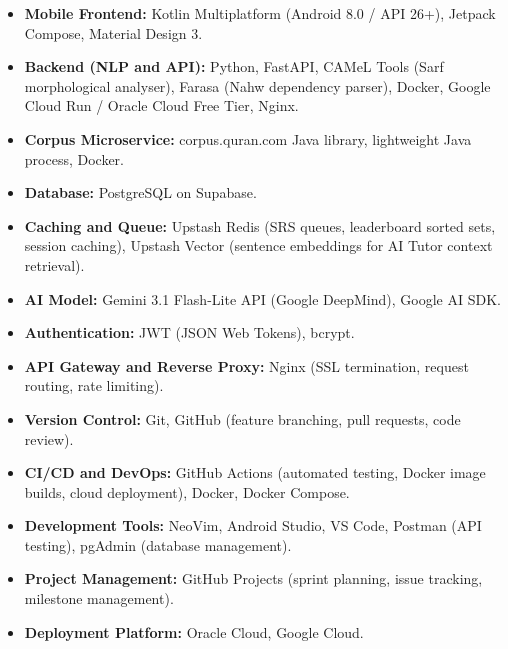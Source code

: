 \documentclass[A4paper,12pt]{article}
\begin{document}
\begin{itemize}[leftmargin=1.5em]

    \item \textbf{Mobile Frontend:}
    Kotlin Multiplatform (Android 8.0 / API 26+), Jetpack Compose, Material Design 3.

    \item \textbf{Backend (NLP and API):}
    Python, FastAPI, CAMeL Tools (Sarf morphological analyser), Farasa (Nahw dependency parser),
    Docker, Google Cloud Run / Oracle Cloud Free Tier, Nginx.

    \item \textbf{Corpus Microservice:}
    corpus.quran.com Java library, lightweight Java process, Docker.

    \item \textbf{Database:}
    PostgreSQL on Supabase.

    \item \textbf{Caching and Queue:}
    Upstash Redis (SRS queues, leaderboard sorted sets, session caching),
    Upstash Vector (sentence embeddings for AI Tutor context retrieval).

    \item \textbf{AI Model:}
    Gemini 3.1 Flash-Lite API (Google DeepMind), Google AI SDK.

    \item \textbf{Authentication:}
    JWT (JSON Web Tokens), bcrypt.

    \item \textbf{API Gateway and Reverse Proxy:}
    Nginx (SSL termination, request routing, rate limiting).

    \item \textbf{Version Control:}
    Git, GitHub (feature branching, pull requests, code review).

    \item \textbf{CI/CD and DevOps:}
    GitHub Actions (automated testing, Docker image builds, cloud deployment), Docker, Docker Compose.

    \item \textbf{Development Tools:}
    NeoVim, Android Studio, VS Code, Postman (API testing), pgAdmin (database management).

    \item \textbf{Project Management:}
    GitHub Projects (sprint planning, issue tracking, milestone management).

    \item \textbf{Deployment Platform:}
    Oracle Cloud, Google Cloud.

\end{itemize}
\end{document}
